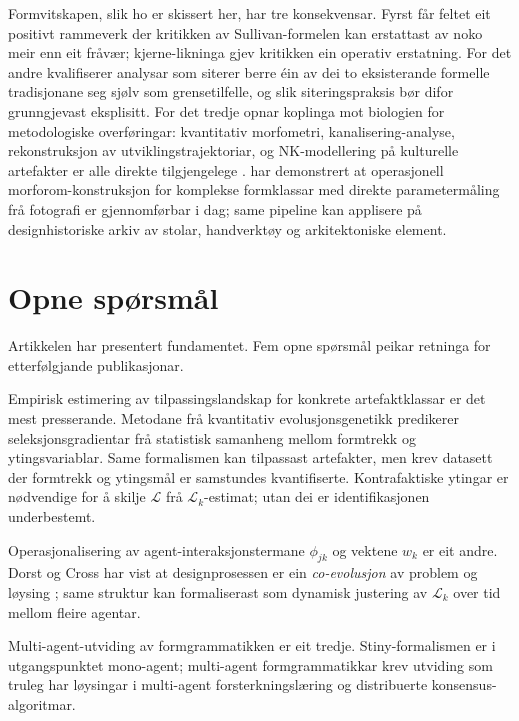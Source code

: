 \documentclass[10pt,a4paper,twocolumn]{article}
\begin{document}
Formvitskapen, slik ho er skissert her, har tre konsekvensar. Fyrst får feltet eit positivt rammeverk der kritikken av Sullivan-formelen kan erstattast av noko meir enn eit fråvær; kjerne-likninga gjev kritikken ein operativ erstatning. For det andre kvalifiserer analysar som siterer berre éin av dei to eksisterande formelle tradisjonane seg sjølv som grensetilfelle, og slik siteringspraksis bør difor grunngjevast eksplisitt. For det tredje opnar koplinga mot biologien for metodologiske overføringar: kvantitativ morfometri, kanalisering-analyse, rekonstruksjon av utviklingstrajektoriar, og NK-modellering på kulturelle artefakter er alle direkte tilgjengelege \citep{wright1932, lande1979, arnold2001, wagner2005, mcghee2007, polly2016}. \citet{contrerasfigueroa2023} har demonstrert at operasjonell morforom-konstruksjon for komplekse formklassar med direkte parametermåling frå fotografi er gjennomførbar i dag; same pipeline kan applisere på designhistoriske arkiv av stolar, handverktøy og arkitektoniske element.

\section{Opne spørsmål}

Artikkelen har presentert fundamentet. Fem opne spørsmål peikar retninga for etterfølgjande publikasjonar.

Empirisk estimering av tilpassingslandskap for konkrete artefaktklassar er det mest presserande. Metodane frå kvantitativ evolusjonsgenetikk \citep{lande1979, arnold2001} predikerer seleksjonsgradientar frå statistisk samanheng mellom formtrekk og ytingsvariablar. Same formalismen kan tilpassast artefakter, men krev datasett der formtrekk og ytingsmål er samstundes kvantifiserte. Kontrafaktiske ytingar er nødvendige for å skilje $\mathcal{L}$ frå $\mathcal{L}_k$-estimat; utan dei er identifikasjonen underbestemt.

Operasjonalisering av agent-interaksjonstermane $\phi_{jk}$ og vektene $w_k$ er eit andre. Dorst og Cross har vist at designprosessen er ein \textit{co-evolusjon} av problem og løysing \citep{dorstcross2001}; same struktur kan formaliserast som dynamisk justering av $\mathcal{L}_k$ over tid mellom fleire agentar.

Multi-agent-utviding av formgrammatikken er eit tredje. Stiny-formalismen \citep{stiny2006} er i utgangspunktet mono-agent; multi-agent formgrammatikkar krev utviding som truleg har løysingar i multi-agent forsterkningslæring og distribuerte konsensus-algoritmar.
\end{document}
